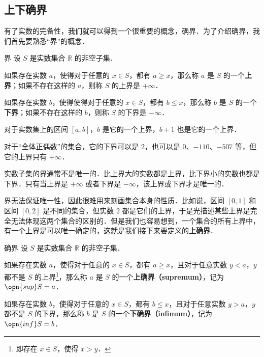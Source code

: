 
\begin{issues}
\issueDraft
\end{issues}



\subsection{上下确界}

有了实数的完备性，我们就可以得到一个很重要的概念，确界．为了介绍确界，我们首先要熟悉“界”的概念．

\begin{definition}{界}
设 $S$ 是实数集合 $\mathbb{R}$ 的非空子集．

如果存在实数 $a$，使得对于任意的 $x\in S$，都有 $a\geq x$，那么称 $a$ 是 $S$ 的一个\textbf{上界}；如果不存在这样的 $a$，则称 $S$ 的上界是 $+\infty$．

如果存在实数 $b$，使得使得对于任意的 $x\in S$，都有 $b\leq x$，那么称 $b$ 是 $S$ 的一个\textbf{下界}；如果不存在这样的 $b$，则称 $S$ 的下界是 $-\infty$．
\end{definition}

\begin{example}{}
对于实数集上的区间 $[a, b]$，$b$ 是它的一个上界，$b+1$ 也是它的一个上界．

对于“全体正偶数”的集合，它的下界可以是 $2$，也可以是 $0$、$-110$、$-507$ 等，但它的上界只有 $+\infty$．
\end{example}

实数子集的界通常不是唯一的．比上界大的实数都是上界，比下界小的实数也都是下界．只有当上界是 $+\infty$ 或者下界是 $-\infty$，该上界或下界才是唯一的．

界无法保证唯一性，因此很难用来刻画集合本身的性质．比如说，区间 $[0, 1]$ 和区间 $[0, 2]$ 是不同的集合，但实数 $2$ 都是它们的上界，于是光描述某些上界是完全无法体现这两个集合的区别的．但是我们也容易想到，一个集合的所有上界中，有一个上界是可以唯一确定的，这就是我们接下来要定义的\textbf{上确界}．

\begin{definition}{确界}
设 $S$ 是实数集合 $\mathbb{R}$ 的非空子集．

如果存在实数 $a$，使得对于任意的 $x\in S$，都有 $a\geq x$，且对于任意实数 $y<a$，$y$ 都不是 $S$ 的上界\footnote{即存在 $x\in S$，使得 $x>y$．}，那么称 $a$ 是 $S$ 的一个\textbf{上确界（supremum）}，记为 $\opn{sup} S=a$．

如果存在实数 $b$，使得对于任意的 $x\in S$，都有 $b\leq x$，且对于任意实数 $y>a$，$y$ 都不是 $S$ 的下界，那么称 $b$ 是 $S$ 的一个\textbf{下确界（infimum）}，记为 $\opn{inf} S=b$．



\end{definition}


